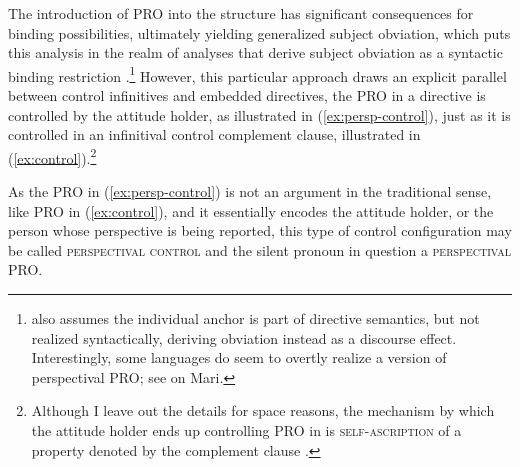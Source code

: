 \documentclass[output=paper,colorlinks,citecolor=brown]{langscibook}
\begin{document}
The introduction of PRO into the structure has significant consequences for binding possibilities, ultimately yielding generalized subject obviation, which puts this analysis in the realm of analyses that derive subject obviation as a syntactic binding restriction \citep[e.g.][]{picallo85,kempchinsky86,kempchinsky09,rizzi90b,progovac93,bianchi01}.\footnote{\textcite{kaufmann19} also assumes the individual anchor is part of directive semantics, but not realized syntactically, deriving obviation instead as a discourse effect. Interestingly, some languages do seem to overtly realize a version of perspectival PRO; see \citet{burukina23b} on Mari.} However, this particular approach draws an explicit parallel between control infinitives and embedded directives, the PRO in a directive is controlled by the attitude holder, as illustrated in (\ref{ex:persp-control}), just as it is controlled in an infinitival control complement clause, illustrated in (\ref{ex:control}).\footnote{\label{ftn:control}Although I leave out the details for space reasons, the mechanism by which the attitude holder ends up controlling PRO in \citet{Stegovec2017,stegovec19} is \textsc{self-ascription} of a property denoted by the complement clause \citep[following][]{lewis79,chierchia87,pearson12,pearson16}.} 

\ea \label{ex:cntrl} 
\z\z 

\noindent As the PRO in (\ref{ex:persp-control}) is not an argument in the traditional sense, like PRO in (\ref{ex:control}), and it essentially encodes the attitude holder, or the person whose perspective is being reported, this type of control configuration may be called \textsc{perspectival control} and the silent pronoun in question a \textsc{perspectival PRO}.
\end{document}
